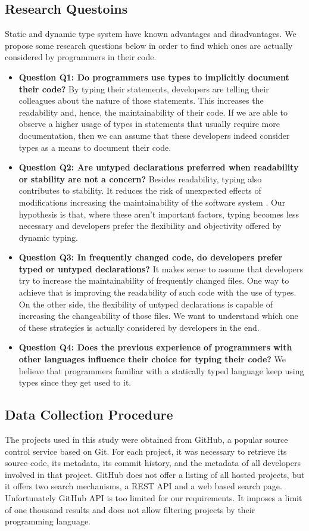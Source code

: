 \documentclass[preprint]{sigplanconf}
\begin{document}
\subsection{Research Questoins\label{questions}}
Static and dynamic type system have known advantages and disadvantages.
We propose some research questions below in order to find which ones are actually considered by programmers in their code.

\begin{itemize}
	\item \textbf{Question Q1: Do programmers use types to implicitly document their code?} By typing their statements, developers are telling their colleagues about the nature of those statements. This increases the readability and, hence, the maintainability of their code. If we are able to observe a higher usage of types in statements that usually require more documentation, then we can assume that these developers indeed consider types as a means to document their code.
	\item \textbf{Question Q2: Are untyped declarations preferred when readability or stability are not a concern?} Besides readability, typing also contributes to stability. It reduces the risk of unexpected effects of modifications increasing the maintainability of the software system \cite{Iso2004}. Our hypothesis is that, where these aren't important factors, typing becomes less necessary and developers prefer the flexibility and objectivity offered by dynamic typing. 
	\item \textbf{Question Q3: In frequently changed code, do developers prefer typed or untyped declarations?} It makes sense to assume that developers try to increase the maintainability of frequently changed files. One way to achieve that is improving the readability of such code with the use of types. On the other side, the flexibility of untyped declarations is capable of increasing the changeability of those files. We want to understand which one of these strategies is actually considered by developers in the end.
	\item \textbf{Question Q4: Does the previous experience of programmers with other languages influence their choice for typing their code?} We believe that programmers familiar with a statically typed language keep using types since they get used to it. 
\end{itemize}

\subsection{Data Collection Procedure\label{dataCollection}}
The projects used in this study were obtained from GitHub, a popular source control service based on Git.
For each project, it was necessary to retrieve its source code, its metadata, its commit history, and the metadata of all developers involved in that project.
GitHub does not offer a listing of all hosted projects, but it offers two search mechanisms, a REST API and a web based search page.
Unfortunately GitHub API is too limited for our requirements.
It imposes a limit of one thousand results and does not allow filtering projects by their programming language.
\end{document}

